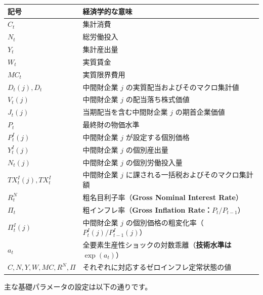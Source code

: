 \documentclass[
  japanese,
  lualatex,
  ja=standard,
  12pt,
  a4paper]{ltjsarticle}
\newcounter{none} %
\begin{document}
{\def\LTcaptype{none} %
\begin{longtable}[]{@{}
  >{\raggedright\arraybackslash}p{}
  >{\raggedright\arraybackslash}p{}@{}}
\toprule\noalign{}
\begin{minipage}[b]{\linewidth}\raggedright
記号
\end{minipage} & \begin{minipage}[b]{\linewidth}\raggedright
経済学的な意味
\end{minipage} \\
\midrule\noalign{}
\endhead
\bottomrule\noalign{}
\endlastfoot
\(C_t\) & 集計消費 \\
\(N_t\) & 総労働投入 \\
\(Y_t\) & 集計産出量 \\
\(W_t\) & 実質賃金 \\
\(MC_t\) & 実質限界費用 \\
\(D_t(j), D_t\) & 中間財企業 \(j\) の実質配当およびそのマクロ集計値 \\
\(V_t(j)\) & 中間財企業 \(j\) の配当落ち株式価値 \\
\(J_t(j)\) & 当期配当を含む中間財企業 \(j\) の期首企業価値 \\
\(P_t\) & 最終財の物価水準 \\
\(P_t^I(j)\) & 中間財企業 \(j\) が設定する個別価格 \\
\(Y_t^I(j)\) & 中間財企業 \(j\) の個別産出量 \\
\(N_t(j)\) & 中間財企業 \(j\) の個別労働投入量 \\
\(TX_t^I(j), TX_t^I\) & 中間財企業 \(j\)
に課される一括税およびそのマクロ集計額 \\
\(R_t^N\) & 粗名目利子率（\textbf{Gross Nominal Interest Rate}） \\
\(\Pi_t\) & 粗インフレ率（\textbf{Gross Inflation
Rate：\(P_t/P_{t-1}\)}） \\
\(\Pi_t^I(j)\) & 中間財企業 \(j\)
の個別価格の粗変化率（\textbf{\(P_t^I(j)/P_{t-1}^I(j)\)}） \\
\(a_t\) & 全要素生産性ショックの対数乖離（\textbf{技術水準は
\(\exp(a_t)\)}） \\
\(C, N, Y, W, MC, R^N, \Pi\) &
それぞれに対応するゼロインフレ定常状態の値 \\
\end{longtable}
}

主な基礎パラメータの設定は以下の通りです。
\end{document}
